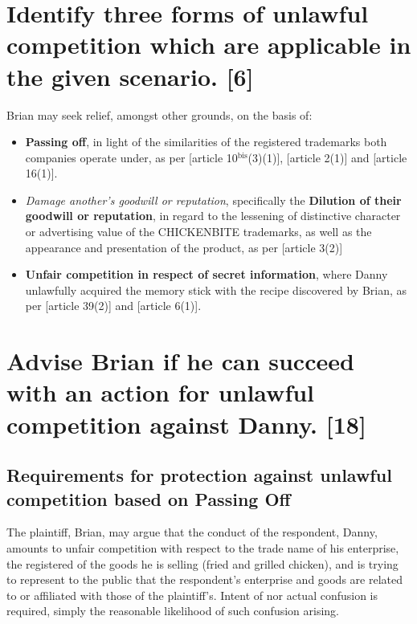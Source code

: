 \documentclass[11pt]{article}
\begin{document}
\section{Identify three forms of unlawful competition which are applicable in the given scenario. [6]}
\label{sec:orgc02846c}
Brian may seek relief, amongst other grounds, on the basis of:
\begin{itemize}
\item \textbf{Passing off}, in light of the similarities of the registered trademarks both companies operate under, as per [article
10\(^{\text{bis}}\)(3)(1)]\cite{wipo83_paris_conve_protect_ip}, [article
2(1)]\cite{wipo96_model_provi_unfair_comp} and [article 16(1)]\cite{wto17_trips}.
\item \emph{Damage another's goodwill or reputation}, specifically the \textbf{Dilution of their
goodwill or reputation}, in regard to the lessening of distinctive character
or advertising value of the CHICKENBITE trademarks, as well as the appearance and
presentation of the product, as per [article 3(2)]\cite{wipo96_model_provi_unfair_comp}
\item \textbf{Unfair competition in respect of secret information}, where Danny unlawfully
acquired the memory stick with the recipe discovered by Brian, as per
[article 39(2)]\cite{wto17_trips} and [article 6(1)]\cite{wipo96_model_provi_unfair_comp}.
\end{itemize}

\section{Advise Brian if he can succeed with an action for unlawful competition against Danny. [18]}
\label{sec:orgaf4cdbb}
\subsection{Requirements for protection against unlawful competition based on Passing Off}
\label{sec:orga38ef13}
The plaintiff, Brian, may argue that the conduct of the respondent, Danny,
amounts to unfair competition with respect to the trade name of his enterprise,
the registered of the goods he is selling (fried and grilled chicken), and is
trying to represent to the public that the respondent's enterprise and goods are
related to or affiliated with those of the plaintiff's. Intent of nor actual
confusion is required, simply the reasonable likelihood of such confusion
arising.\\
\end{document}
